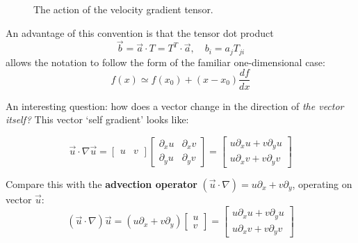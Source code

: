 \documentclass[12pt, a4paper, twoside, openright]{book}
\begin{document}
\begin{figure}[ht]
\centering
{}
\caption{The action of the velocity gradient tensor.}\label{velgradtensor}
\end{figure}


An advantage of this convention is that the tensor dot product
\begin{equation}
\vec{b} = \vec{a} \cdot T = T^{T} \cdot \vec{a}, \quad b_i = a_j T_{ji}
\end{equation}
allows the notation to follow the form of the familiar one-dimensional case:
\begin{equation*}
f(x) \simeq f(x_0) + (x - x_0) \frac{df}{dx}
\end{equation*}


\vspace*{2em}
An interesting question: how does a vector change in the direction of \emph{the vector itself?} This vector `self gradient' looks like:

\begin{equation}
\vec{u} \cdot \nabla \vec{u}
=
\begin{bmatrix}
u & v
\end{bmatrix}
\begin{bmatrix}
\partial_x u & \partial_x v \\
\partial_y u & \partial_y v
\end{bmatrix}
=
\begin{bmatrix}
u \partial_x u + v \partial_y u \\
u \partial_x v + v \partial_y v
\end{bmatrix}
\end{equation}


Compare this with the \textbf{advection operator}  $(\vec{u} \cdot \nabla ) = u \partial_x + v \partial_y $, operating on vector $\vec{u}$:
\begin{equation}
(\vec{u} \cdot \nabla ) \vec{u} = ( u \partial_x + v \partial_y )
\begin{bmatrix}
u \\ v
\end{bmatrix}
=
\begin{bmatrix}
u \partial_x u + v \partial_y u \\
u \partial_x v + v \partial_y v
\end{bmatrix}
\end{equation}
\end{document}
